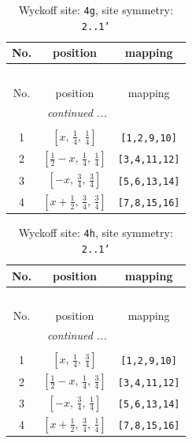 \documentclass[fleqn,8pt]{jsarticle}
\begin{document}
\renewcommand{\arraystretch}{1.2}
\begin{longtable}{ccc}
\caption{Wyckoff site: {\tt 4g}, site symmetry: {\tt 2..1'}}
 \\
 \hline \hline
No. & position & mapping \\ \hline \endfirsthead

\multicolumn{2}{l}{\tablename\ \thetable{}} \\
 \hline \hline
No. & position & mapping \\ \hline \endhead

 \hline \hline
\multicolumn{2}{r}{\footnotesize\it continued ...} \\ \endfoot

 \hline \hline
\multicolumn{2}{r}{} \\ \endlastfoot

1 & $\left[ x,\, \frac{1}{4},\, \frac{1}{4} \right]$ & {\tt [1,2,9,10]} \\ \hline
2 & $\left[ \frac{1}{2} - x,\, \frac{1}{4},\, \frac{1}{4} \right]$ & {\tt [3,4,11,12]} \\ \hline
3 & $\left[ - x,\, \frac{3}{4},\, \frac{3}{4} \right]$ & {\tt [5,6,13,14]} \\ \hline
4 & $\left[ x + \frac{1}{2},\, \frac{3}{4},\, \frac{3}{4} \right]$ & {\tt [7,8,15,16]} \\
\end{longtable}
\renewcommand{\arraystretch}{1.2}
\begin{longtable}{ccc}
\caption{Wyckoff site: {\tt 4h}, site symmetry: {\tt 2..1'}}
 \\
 \hline \hline
No. & position & mapping \\ \hline \endfirsthead

\multicolumn{2}{l}{\tablename\ \thetable{}} \\
 \hline \hline
No. & position & mapping \\ \hline \endhead

 \hline \hline
\multicolumn{2}{r}{\footnotesize\it continued ...} \\ \endfoot

 \hline \hline
\multicolumn{2}{r}{} \\ \endlastfoot

1 & $\left[ x,\, \frac{1}{4},\, \frac{3}{4} \right]$ & {\tt [1,2,9,10]} \\ \hline
2 & $\left[ \frac{1}{2} - x,\, \frac{1}{4},\, \frac{3}{4} \right]$ & {\tt [3,4,11,12]} \\ \hline
3 & $\left[ - x,\, \frac{3}{4},\, \frac{1}{4} \right]$ & {\tt [5,6,13,14]} \\ \hline
4 & $\left[ x + \frac{1}{2},\, \frac{3}{4},\, \frac{1}{4} \right]$ & {\tt [7,8,15,16]} \\
\end{longtable}
\end{document}
